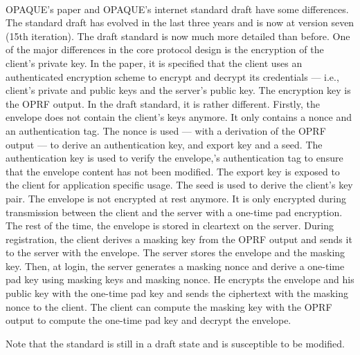 ﻿\documentclass[../report.tex]{subfiles}
\begin{document}
\paragraph{} \label{sec:opaque_paper_vs_draft}
OPAQUE's paper \cite{OPAQUE_Paper} and OPAQUE's internet standard draft \cite{OPAQUE_Standard_Draft} have some differences. The standard draft has evolved in the last three years and is now at version seven (15th iteration).
The draft standard is now much more detailed than before.
One of the major differences in the core protocol design is the encryption of the client's private key.
In the paper, it is specified that the client uses an authenticated encryption scheme to encrypt and decrypt its credentials --- i.e., client's private and public keys and the server's public key. The encryption key is the OPRF output.
In the draft standard, it is rather different.
Firstly, the envelope does not contain the client's keys anymore. It only contains a nonce and an authentication tag. 
The nonce is used --- with a derivation of the OPRF output --- to derive an authentication key, and export key and a seed.
The authentication key is used to verify the envelope,'s authentication tag to ensure that the envelope content has not been modified.
The export key is exposed to the client for application specific usage.
The seed is used to derive the client's key pair.
The envelope is not encrypted at rest anymore. It is only encrypted during transmission between the client and the server with a one-time pad encryption. The rest of the time, the envelope is stored in cleartext on the server.
During registration, the client derives a masking key from the OPRF output and sends it to the server with the envelope. The server stores the envelope and the masking key.
Then, at login, the server generates a masking nonce and derive a one-time pad key using masking keys and masking nonce. He encrypts the envelope and his public key with the one-time pad key and sends the ciphertext with the masking nonce to the client.
The client can compute the masking key with the OPRF output to compute the one-time pad key and decrypt the envelope.

Note that the standard is still in a draft state and is susceptible to be modified.

\subsection{}
\end{document}
